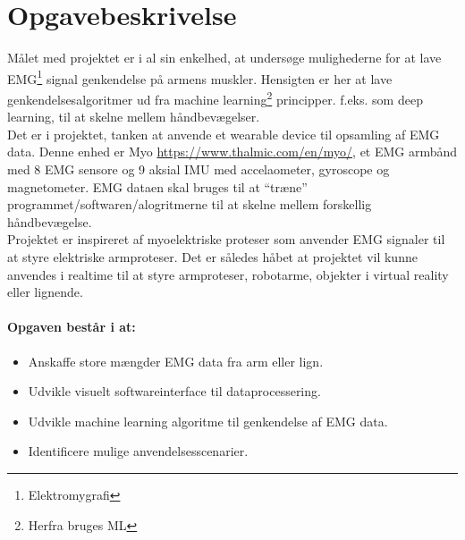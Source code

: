 \thispagestyle{fancy}
\chapter{Opgavebeskrivelse}
Målet med projektet er i al sin enkelhed, at undersøge mulighederne for at lave EMG\footnote{Elektromygrafi} signal genkendelse på armens muskler. Hensigten er her at lave genkendelsesalgoritmer ud fra machine learning\footnote{Herfra bruges ML} principper. f.eks. som deep learning, til at skelne mellem håndbevægelser.\\

Det er i projektet, tanken at anvende et wearable device til opsamling af EMG data. Denne enhed er Myo \href{https://www.thalmic.com/en/myo/}{https://www.thalmic.com/en/myo/}, et EMG armbånd med 8 EMG sensore og 9 aksial IMU med accelaometer, gyroscope og magnetometer. EMG dataen skal bruges til at “træne” programmet/softwaren/alogritmerne til at skelne mellem forskellig håndbevægelse.\\

Projektet er inspireret af myoelektriske proteser som anvender EMG signaler til at styre elektriske armproteser. Det er således håbet at projektet vil kunne anvendes i realtime til at styre armproteser, robotarme, objekter i virtual reality eller lignende.

\subsubsection*{Opgaven består i at:}
\begin{itemize}
	\item Anskaffe store mængder EMG data fra arm eller lign.
	\item Udvikle visuelt softwareinterface til dataprocessering.
	\item Udvikle machine learning algoritme til genkendelse af EMG data.
	\item Identificere mulige anvendelsesscenarier.
\end{itemize}